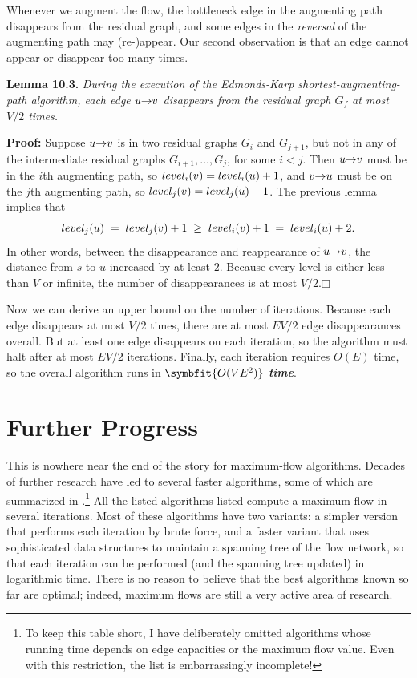 Whenever we augment the flow, the bottleneck edge in the augmenting path disappears from the residual graph, and some edges in the \textit{reversal} of the augmenting path may (re-)appear.
Our second observation is that an edge cannot appear or disappear too many times.

\noindent\textbf{Lemma 10.3.} \textsl{During the execution of the Edmonds-Karp shortest-augmenting-path algorithm, each edge $u\mathord{\rightarrow}v$ disappears from the residual graph $G_f$ at most $V/2$ times.}

\noindent\textbf{Proof:} Suppose $u\mathord{\rightarrow}v$ is in two residual graphs $G_i$ and $G_{j+1}$, but not in any of the intermediate residual graphs $G_{i+1},\dots,G_j$, for some $i < j$.
Then $u\mathord{\rightarrow}v$ must be in the $i$th augmenting path, so $level_i(v) = level_i(u) + 1$, and $v\mathord{\rightarrow}u$ must be on the $j$th augmenting path, so $level_j(v) = level_j(u) - 1$.
The previous lemma implies that
\[
level_j(u) \;=\; level_j(v) + 1 \;\ge\; level_i(v) + 1 \;=\; level_i(u) + 2.
\]
In other words, between the disappearance and reappearance of $u\mathord{\rightarrow}v$, the distance from $s$ to $u$ increased by at least $2$.
Because every level is either less than $V$ or infinite, the number of disappearances is at most $V/2$.\hfill$\mdlgwhtsquare$

Now we can derive an upper bound on the number of iterations.
Because each edge disappears at most $V/2$ times, there are at most $EV/2$ edge disappearances overall.
But at least one edge disappears on each iteration, so the algorithm must halt after at most $EV/2$ iterations.
Finally, each iteration requires $O(E)$ time, so the overall algorithm runs in $\symbfit{O(VE^2)}$ \textbf{\textit{time}}.

\section{Further Progress}
\label{sec:10.7}

This is nowhere near the end of the story for maximum-flow algorithms.
Decades of further research have led to several faster algorithms, some of which are summarized in .\footnote{To keep this table short, I have deliberately omitted algorithms whose running time depends on edge capacities or the maximum flow value. Even with this restriction, the list is embarrassingly incomplete!}
All the listed algorithms listed compute a maximum flow in several iterations.
Most of these algorithms have two variants: a simpler version that performs each iteration by brute force, and a faster variant that uses sophisticated data structures to maintain a spanning tree of the flow network, so that each iteration can be performed (and the spanning tree updated) in logarithmic time.
There is no reason to believe that the best algorithms known so far are optimal; indeed, maximum flows are still a very active area of research.

